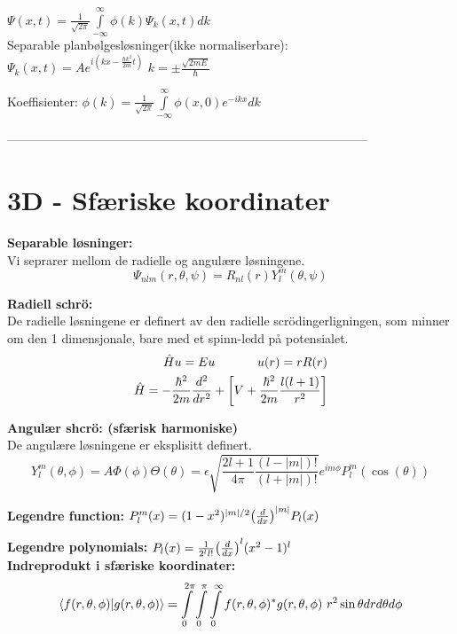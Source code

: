 \documentclass[10p,a4paper]{extarticle}
\renewcommand{\exp}{e^}
\begin{document}
\begin{multicols}{2}
$\Psi(x,t) = \frac{1}{\sqrt{2\pi}}\int\limits_{-\infty}^\infty\phi(k)\Psi_k(x,t) dk$ 
\\

Separable planbølgesløsninger(ikke normaliserbare):\\
$\Psi_k(x,t) = A\exp{i(kx-\frac{\hbar k^2}{2m}t)}$ \hspace{1cm} $k = \pm \frac{\sqrt{2mE}}{\hbar}$

Koeffisienter: $\phi(k) = \frac{1}{\sqrt{2\pi}}\int\limits_{-\infty}^\infty\phi(x,0)\exp{-ikx} dk$


---------------------------------------------------------------------------------------



\section*{3D - Sfæriske koordinater}
\textbf{Separable løsninger:}\\
Vi seprarer mellom de radielle og angulære løsningene.
\[ \Psi_{nlm}(r, \theta, \psi) = R_{nl}(r)Y_l^m(\theta, \psi) \]

\textbf{Radiell schrö:}\\
De radielle løsningene er definert av den radielle scrödingerligningen, som minner om den 1 dimensjonale, bare med et spinn-ledd på potensialet.
\begin{align*} \hat{H}u = Eu \hspace{1.2cm} u(r) = rR(r)\\
\hat{H} = -\frac{\hbar^2}{2m}\frac{d^2}{dr^2} + \qty[V + \frac{\hbar^2}{2m}\frac{l(l+1)}{r^2}]\end{align*}

\textbf{Angulær shcrö: (sfærisk harmoniske)}\\
De angulære løsningene er eksplisitt definert.
\[ Y_l^m(\theta, \phi) = A\Phi(\phi)\Theta(\theta) = \epsilon\sqrt{\frac{2l+1}{4\pi}\frac{(l-|m|)!}{(l+|m|)!}} e^{im\phi} P_l^m(\cos(\theta)) \]

\textbf{Legendre function:} $P_l^m(x) = (1-x^2)^{|m|/2} \qty(\frac{d}{dx})^{|m|} P_l(x)$

\textbf{Legendre polynomials:} $P_l(x) = \frac{1}{2^ll!}\qty(\frac{d}{dx})^l (x^2-1)^l$
\\

\textbf{Indreprodukt i sfæriske koordinater:}
\[ \bra{f(r,\theta,\phi)}\ket{g(r,\theta,\phi)} = \int\limits_0^{2\pi}\int\limits_0^\pi\int\limits_0^\infty f(r,\theta,\phi)^*g(r,\theta,\phi)\ r^2\sin\theta dr d\theta d\phi \]


\end{multicols}
\end{document}
